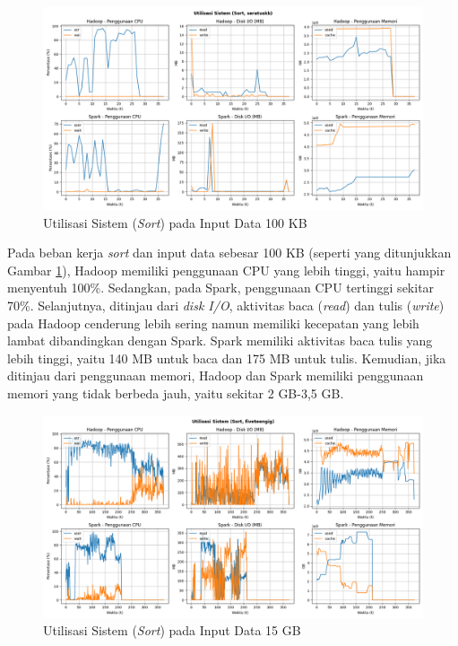 \begin{figure}[h]
    \centering
    \includegraphics[width=1\textwidth]{figures/ch04/5-util-sistem-sort-seratuskb}
    \caption{Utilisasi Sistem (\textit{Sort}) pada Input Data 100 KB}
    \label{fig:5-util-sistem-sort-seratuskb}
\end{figure}

Pada beban kerja \textit{sort} dan input data sebesar 100 KB (seperti yang ditunjukkan Gambar \ref{fig:5-util-sistem-sort-seratuskb}), Hadoop memiliki penggunaan CPU yang lebih tinggi, yaitu hampir menyentuh 100\%. Sedangkan, pada Spark, penggunaan CPU tertinggi sekitar 70\%. Selanjutnya, ditinjau dari \textit{disk I/O}, aktivitas baca (\textit{read}) dan tulis (\textit{write}) pada Hadoop cenderung lebih sering namun memiliki kecepatan yang lebih lambat dibandingkan dengan Spark. Spark memiliki aktivitas baca tulis yang lebih tinggi, yaitu 140 MB untuk baca dan 175 MB untuk tulis. Kemudian, jika ditinjau dari penggunaan memori, Hadoop dan Spark memiliki penggunaan memori yang tidak berbeda jauh, yaitu sekitar 2 GB-3,5 GB. 

\begin{figure}[h]
    \centering
    \includegraphics[width=1\textwidth]{figures/ch04/5-util-sistem-sort-fiveteengig}
    \caption{Utilisasi Sistem (\textit{Sort}) pada Input Data 15 GB}
    \label{fig:5-util-sistem-sort-fiveteengig}
\end{figure}


